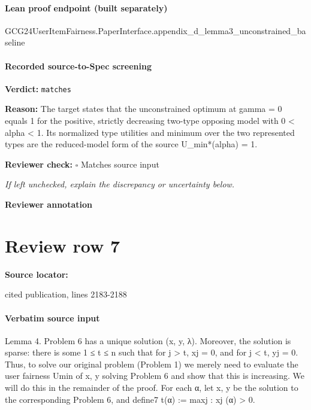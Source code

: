 \documentclass[10pt]{article}
\newcommand{\reviewerbox}{%
  \par\noindent\fbox{\parbox{0.96\linewidth}{\rule{0pt}{0.38in}}}\par
}
\newcommand{\reviewmatch}[1]{%
  \par\noindent\textbf{Reviewer check:} $\square$\; #1\par
  \noindent\emph{If left unchecked, explain the discrepancy or uncertainty below.}\par
}
\begin{document}
\paragraph{Lean proof endpoint (built separately)}\begin{ReviewVerbatim}
GCG24UserItemFairness.PaperInterface.appendix_d_lemma3_unconstrained_baseline
\end{ReviewVerbatim}

\paragraph{Recorded source-to-Spec screening}
\textbf{Verdict:} \texttt{matches}
\\
{\raggedright
\textbf{Reason:} The target states that the unconstrained optimum at gamma = 0 equals 1 for the positive, strictly decreasing two-\allowbreak{}type opposing model with 0 < alpha < 1.\allowbreak{} Its normalized type utilities and minimum over the two represented types are the reduced-\allowbreak{}model form of the source U\_\allowbreak{}min*(alpha) = 1.\allowbreak{}
\par}
\reviewmatch{Matches source input}
\noindent\textbf{Reviewer annotation}\par
\reviewerbox
\clearpage
\hypertarget{source-claim-bdf6b6ab56cd5fdc}{}
\section*{Review row 7}
\textbf{Source locator:} {\footnotesize\raggedright cited publication, lines 2183-\allowbreak{}2188\par}
\paragraph{Verbatim source input}
\begin{ReviewVerbatim}
Lemma 4. Problem 6 has a unique solution (x, y, λ). Moreover, the solution is sparse: there is some
1 ≤ t ≤ n such that for j > t, xj = 0, and for j < t, yj = 0.
Thus, to solve our original problem (Problem 1) we merely need to evaluate the user fairness Umin of
x, y solving Problem 6 and show that this is increasing. We will do this in the remainder of the proof.
For each α, let x, y be the solution to the corresponding Problem 6, and define7
t(α) := max{j : xj (α) > 0}.
\end{ReviewVerbatim}
\end{document}
